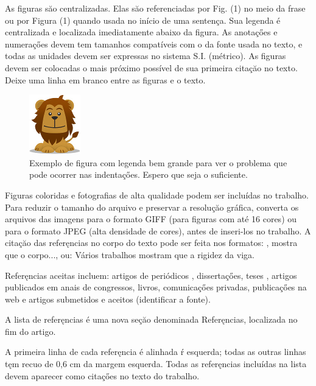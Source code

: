 \documentclass{ufscThesis}
\begin{document}
As figuras săo centralizadas. Elas săo referenciadas por Fig. (1) no meio da frase ou por Figura (1) quando usada no início de uma sentença. Sua legenda é centralizada e localizada imediatamente abaixo da figura. As anotaçőes e numeraçőes devem tem tamanhos compatíveis com o da fonte usada no texto, e todas as unidades devem ser expressas no sistema S.I. (métrico). As figuras devem ser colocadas o mais próximo possível de sua primeira citaçăo no texto. Deixe uma linha em branco entre as figuras e o texto.

\begin{figure}[ht]
\begin{center}
\includegraphics[scale=0.6]{figuras/logo.png}
\caption{Exemplo de figura com legenda bem grande para ver o problema que pode ocorrer nas indentaçőes. Espero que seja o suficiente.}
\end{center}
\end{figure}

Figuras coloridas e fotografias de alta qualidade podem ser incluídas no trabalho. Para reduzir o tamanho do arquivo e preservar a resoluçăo gráfica, converta os arquivos das imagens para o  formato GIFF (para figuras com até 16 cores) ou para o formato JPEG (alta densidade de cores), antes de inseri-los no trabalho.
A citaçăo das referęncias no corpo do texto pode ser feita nos formatos: , mostra que o corpo..., ou: Vários trabalhos  \cite{Coimbra84,Clark86,Sparrow80} mostram que a rigidez da viga.

Referęncias aceitas incluem: artigos de periódicos \cite{Soviero97}, dissertaçőes, teses \cite{Lee03}, artigos publicados em anais de congressos, livros, comunicaçőes privadas, publicaçőes na web \cite{ABCM04,MLA04} e artigos submetidos e aceitos (identificar a fonte)\cite{Autor04}.

A lista de referęncias é uma nova seçăo denominada Referęncias, localizada no fim do artigo.

A primeira linha de cada referęncia é alinhada ŕ esquerda; todas as outras linhas tęm recuo de 0,6 cm da margem esquerda. Todas as referęncias incluídas na lista devem aparecer como citaçőes no texto do trabalho.
\end{document}
